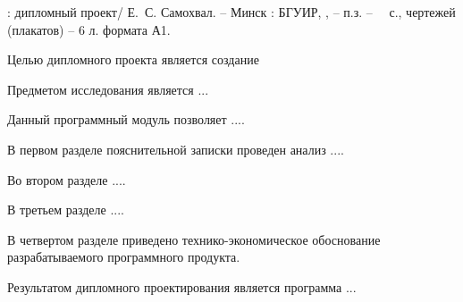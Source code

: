 \thispagestyle{empty}

\MakeUppercase{\topicName}: дипломный проект/ Е.~С. Самохвал. -- Минск : БГУИР, \the\year{}, -- п.з. -- ~\pageref*{LastPage}~с., чертежей (плакатов) -- 6 л. формата А1.

\vspace{4\parsep}


Целью дипломного проекта является создание  

Предметом исследования является ...

Данный программный модуль позволяет ....

В первом разделе пояснительной записки проведен анализ ....

Во втором разделе ....

В третьем разделе ....

В четвертом разделе приведено технико-экономическое обоснование разрабатываемого программного продукта.

Результатом дипломного проектирования является программа ...

\clearpage